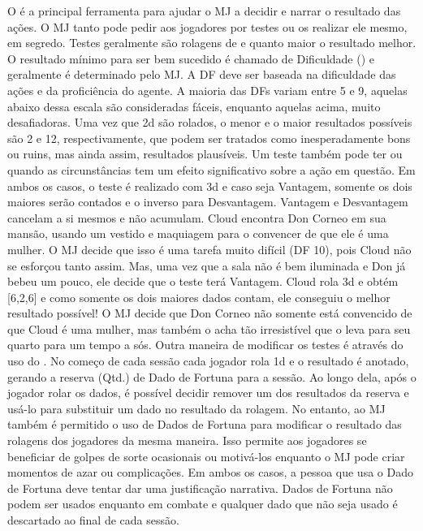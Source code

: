 	O  é a principal ferramenta para ajudar o MJ a decidir e narrar o resultado das ações. 
	O MJ tanto pode pedir aos jogadores por testes ou os realizar ele mesmo, em segredo. 
	Testes geralmente são rolagens de  e quanto maior o resultado melhor. O resultado mínimo para ser bem sucedido é chamado de Dificuldade () e geralmente é determinado pelo MJ. 
	A DF deve ser baseada na dificuldade das ações e da proficiência do agente. A maioria das DFs variam entre 5 e 9, aquelas abaixo dessa escala são consideradas fáceis, enquanto aquelas acima, muito desafiadoras.
%
\ofpar
%
	Uma vez que 2d são rolados, o menor e o maior resultados possíveis são 2 e 12, respectivamente, que podem ser tratados como inesperadamente bons ou ruins, mas ainda assim, resultados plausíveis.
	Um teste também pode ter  ou  quando as circunstâncias tem um efeito significativo sobre a ação em questão. 
	Em ambos os casos, o teste é realizado com 3d e caso seja Vantagem, somente os dois maiores serão contados e o inverso para Desvantagem. 
	Vantagem e Desvantagem cancelam a si mesmos e não acumulam.
%
\clearpage
%
{
	Cloud encontra Don Corneo em sua mansão, usando um vestido e maquiagem para o convencer de que ele é uma mulher. 
	O MJ decide que isso é uma tarefa muito difícil (DF 10), pois Cloud não se esforçou tanto assim. 
	Mas, uma vez que a sala não é bem iluminada e Don já bebeu um pouco, ele decide que o teste terá Vantagem. 
	Cloud rola 3d e obtém [6,2,6] e como somente os dois maiores dados contam, ele conseguiu o melhor resultado possível! 
	O MJ decide que Don Corneo não somente está convencido de que Cloud é uma mulher, mas também o acha tão irresistível que o leva para seu quarto para um tempo a sós.
}
%
\ofpar
%
	Outra maneira de modificar os testes é através do uso do . 
	No começo de cada sessão cada jogador rola 1d e o resultado é anotado, gerando a reserva (Qtd.) de Dado de Fortuna para a sessão. 
	Ao longo dela, após o jogador rolar os dados, é possível decidir remover um dos resultados da reserva e usá-lo para substituir um dado no resultado da rolagem. 
	No entanto, ao MJ também é permitido o uso de Dados de Fortuna para modificar o resultado das rolagens dos jogadores da mesma maneira. 
	Isso permite aos jogadores se beneficiar de golpes de sorte ocasionais ou motivá-los enquanto o MJ pode criar momentos de azar ou complicações. 
	Em ambos os casos, a pessoa que usa o Dado de Fortuna deve tentar dar uma justificação narrativa. Dados de Fortuna não podem ser usados enquanto em combate e qualquer dado que não seja usado é descartado ao final de cada sessão.
